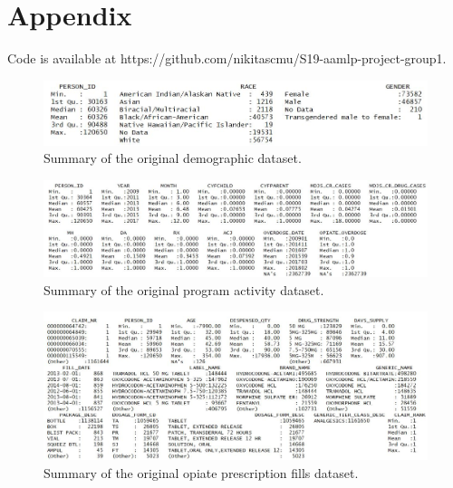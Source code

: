 \documentclass[twoside,10.5pt]{article}
\begin{document}
\newpage
\appendix
\section*{Appendix}
Code is available at https://github.com/nikitascmu/S19-aamlp-project-group1. 

\begin{figure}[h!]
\begin{center}
\includegraphics[width=5in]{images/original_dem_summary.JPG}
\end{center}
\caption{Summary of the original demographic dataset.}
\label{fig:orig_dem}
\end{figure}

\begin{figure}[h!]
\begin{center}
\includegraphics[width=6in]{images/original_prog_summary.JPG}
\end{center}
\caption{Summary of the original program activity dataset.}
\label{fig:orig_prog}
\end{figure}

\begin{figure}[h!]
\begin{center}
\includegraphics[width=6in]{images/original_presc_summary.JPG}
\end{center}
\caption{Summary of the original opiate prescription fills dataset.}
\label{fig:orig_presc}
\end{figure}
\end{document}
